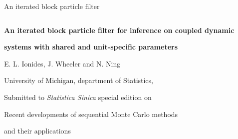 \documentclass[12pt]{article}\usepackage[]{graphicx}\usepackage[]{xcolor}
\begin{document}

\renewcommand{\baselinestretch}{1.5}


{\hfill {\footnotesize\rm An iterated block particle filter} \hfill}

\renewcommand{\thefootnote}{}
$\ $\par


\fontsize{12}{14pt plus.8pt minus .6pt}\selectfont \vspace{0.8pc}
\centerline{\large\bf An iterated block particle filter for inference on coupled dynamic}
\vspace{2pt} 
\centerline{\large\bf systems with shared and unit-specific parameters}
\vspace{.4cm} 
\centerline{E. L. Ionides, J. Wheeler and N. Ning}
\vspace{.4cm} 
\centerline{University of Michigan, department of Statistics,}

 \vspace{.55cm} \fontsize{9}{11.5pt plus.8pt minus.6pt}\selectfont


\centerline{Submitted to {\it Statistica Sinica} special edition on}
\centerline{Recent developments of sequential Monte Carlo methods}
\centerline{and their applications}


\end{document}
